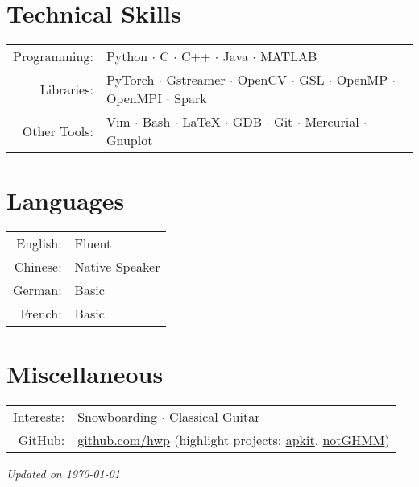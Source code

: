 \documentclass[a4paper,9pt]{extarticle} %
\begin{document}
\section{Technical Skills}

\begin{tabular}{rl}
  Programming: & Python $\cdotp$ C $\cdotp$ C++ $\cdotp$ Java $\cdotp$ MATLAB \\
  Libraries: & PyTorch $\cdotp$ Gstreamer $\cdotp$ OpenCV $\cdotp$ GSL $\cdotp$ OpenMP $\cdotp$ OpenMPI $\cdotp$ Spark \\
  Other Tools: & Vim $\cdotp$ Bash $\cdotp$ \LaTeX{} $\cdotp$ GDB $\cdotp$ Git $\cdotp$ Mercurial $\cdotp$ Gnuplot \\
\end{tabular}


\section{Languages}

\begin{tabular}{rl}
  English: & Fluent \\
  Chinese: & Native Speaker \\
  German: & Basic \\
  French: & Basic \\
\end{tabular}

\section{Miscellaneous}

\begin{tabular}{rl}
  Interests: & Snowboarding $\cdotp$ Classical Guitar \\
  GitHub: & \href{https://github.com/hwp}{github.com/hwp} (highlight projects: \href{https://github.com/hwp/apkit}{apkit}, \href{https://github.com/hwp/notGHMM}{notGHMM}) \\
\end{tabular}



\vfill
\centering \footnotesize \itshape{Updated on \today}
\end{document}
